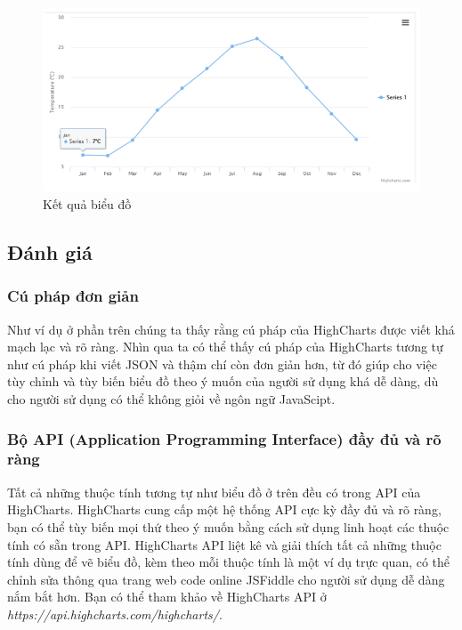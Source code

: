 \begin{center}
	\begin{figure}[htp]
		\begin{center}
			\includegraphics[scale=1]{img/ketquahighcharts}
		\end{center}
		\caption{Kết quả biểu đồ}
		\label{refhinh20}
	\end{figure}
\end{center}

\subsection{Đánh giá}

\subsubsection{Cú pháp đơn giản}
Như ví dụ ở phần trên chúng ta thấy rằng cú pháp của HighCharts được viết khá mạch lạc và rõ ràng. Nhìn qua ta có thể thấy cú pháp của HighCharts tương tự như cú pháp khi viết JSON và thậm chí còn đơn giản hơn, từ đó giúp cho việc tùy chỉnh và tùy biến biểu đồ theo ý muốn của người sử dụng khá dễ dàng, dù cho người sử dụng có thể không giỏi về ngôn ngữ JavaScipt.

\subsubsection{Bộ API (Application Programming Interface) đầy đủ và rõ ràng}
Tất cả những thuộc tính tương tự như biểu đồ ở trên đều có trong API của HighCharts. HighCharts cung cấp một hệ thống API cực kỳ đầy đủ và rõ ràng, bạn có thể tùy biến mọi thứ theo ý muốn bằng cách sử dụng linh hoạt các thuộc tính có sẵn trong API. HighCharts API liệt kê và giải thích tất cả những thuộc tính dùng để vẽ biểu đồ, kèm theo mỗi thuộc tính là một ví dụ trực quan, có thể chỉnh sửa thông qua trang web code online JSFiddle cho người sử dụng dễ dàng nắm bắt hơn. Bạn có thể tham khảo về HighCharts API ở {\it https://api.highcharts.com/highcharts/}.

